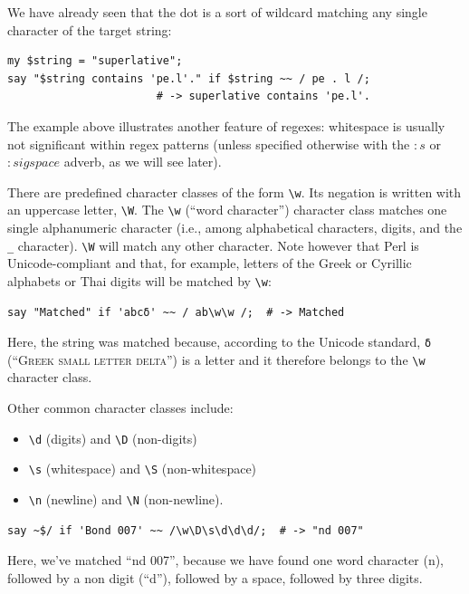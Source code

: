 We have already seen that the dot is a sort of wildcard 
matching any single character of the target string:

\begin{verbatim}
my $string = "superlative";
say "$string contains 'pe.l'." if $string ~~ / pe . l /;
                       # -> superlative contains 'pe.l'.
\end{verbatim}
%

The example above illustrates another feature of regexes: 
whitespace is usually not significant within regex patterns 
(unless specified otherwise with the $:s$ or $:sigspace$ 
adverb, as we will see later).

There are predefined character classes of the form \verb'\w'. 
Its negation is written with an uppercase letter, \verb'\W'. 
The \verb'\w' (``word character'') character class  
matches one single alphanumeric character (i.e., among alphabetical 
characters, digits, and the \verb'_' character). \verb'\W' will match 
any other character. Note however that Perl is Unicode-compliant 
and that, for example, letters of the Greek or Cyrillic alphabets or 
Thai digits will be matched by \verb'\w':

\begin{verbatim}
say "Matched" if 'abcδ' ~~ / ab\w\w /;  # -> Matched
\end{verbatim}
%

Here, the string was matched because, according to the 
Unicode standard, \verb'δ' (``\textsc{Greek small letter 
delta}'') is a letter and it therefore belongs to 
the \verb'\w' character class.

Other common character classes include:
\begin{itemize}
\item \verb'\d' (digits) and \verb'\D' (non-digits)
\item \verb'\s' (whitespace) and \verb'\S' (non-whitespace)
\item \verb'\n' (newline) and \verb'\N' (non-newline).
\end{itemize}

\begin{verbatim}
say ~$/ if 'Bond 007' ~~ /\w\D\s\d\d\d/;  # -> "nd 007"
\end{verbatim}
%

Here, we've matched ``nd 007'', because we have found one 
word character (n), followed by a non digit (``d''), followed 
by a space, followed by three digits.

